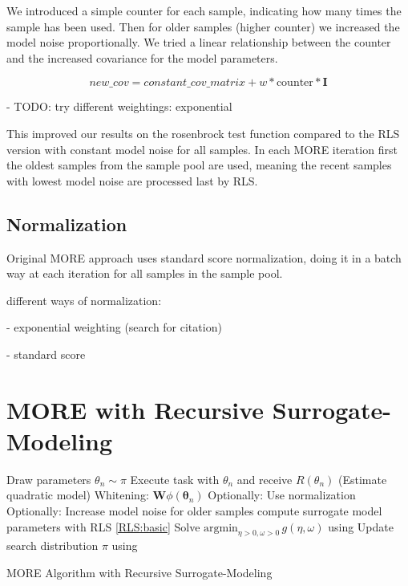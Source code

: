 We introduced a simple counter for each sample, indicating how many times
the sample has been used.
Then for older samples (higher counter) we increased the model
noise proportionally.
We tried a linear relationship between the counter and
the increased covariance for the model parameters.

$$ new\_cov = constant\_cov\_matrix + w * \text{counter} * \mathbf{I} $$

- TODO: try different weightings: exponential

This improved our results on the rosenbrock test function compared
to the RLS version with constant model noise for all samples.
In each MORE iteration first the oldest samples from the sample pool
are used, meaning the recent samples with lowest model noise are
processed last by RLS.


\subsection{Normalization}
Original MORE approach uses standard score normalization, doing it
in a batch way at each iteration for all samples in the sample pool.

different ways of normalization:

- exponential weighting (search for citation)

- standard score

\section{MORE with Recursive Surrogate-Modeling}
\begin{algorithm}[H]
\DontPrintSemicolon
\SetAlgoLined
{}

{
  {
    Draw parameters $\theta_n \sim \pi$\;
    Execute task with $\theta_n$ and receive $R(\theta_n)$\;
  }
  \Begin(Estimate quadratic model)
  {
    {
      Whitening: $\mathbf{W}\phi(\mathbf{\theta}_n)$\;
      Optionally: Use normalization\;
      Optionally: Increase model noise for older samples\;      
      compute surrogate model parameters with RLS  \cref{RLS:basic}\;
    }
  }
  Solve  $\text{argmin}_{\eta >0, \omega > 0} \, g(\eta, \omega)$
  using  \;
  Update search distribution $\pi$ using \;
}
\caption{MORE Algorithm with Recursive Surrogate-Modeling}
\end{algorithm}



